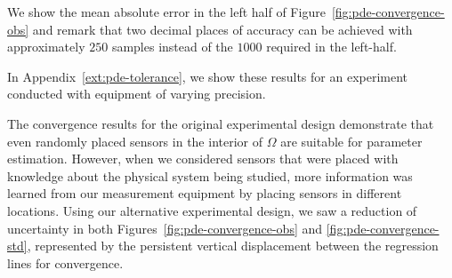 We show the mean absolute error in the left half of Figure~\ref{fig:pde-convergence-obs} and remark that two decimal places of accuracy can be achieved with approximately $250$ samples instead of the $1000$ required in the left-half.

In Appendix~\ref{ext:pde-tolerance}, we show these results for an experiment conducted with equipment of varying precision.

The convergence results for the original experimental design demonstrate that even randomly placed sensors in the interior of $\Omega$ are suitable for parameter estimation.
However, when we considered sensors that were placed with knowledge about the physical system being studied, more information was learned from our measurement equipment by placing sensors in different locations.
Using our alternative experimental design, we saw a reduction of uncertainty in both Figures~\ref{fig:pde-convergence-obs} and \ref{fig:pde-convergence-std}, represented by the persistent vertical displacement between the regression lines for convergence.


\FloatBarrier
%
